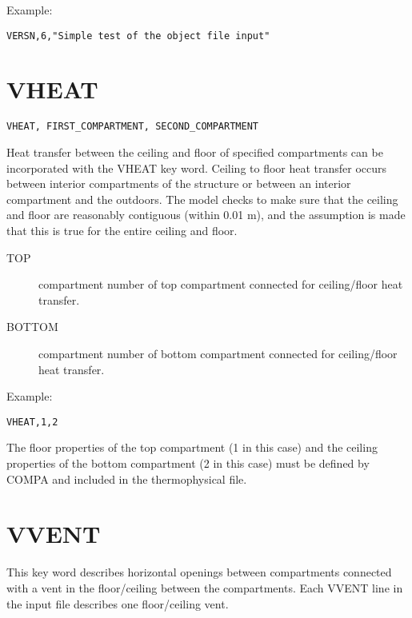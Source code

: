 \noindent Example:

\begin{lstlisting}
VERSN,6,"Simple test of the object file input"
\end{lstlisting}

\section{VHEAT}

\begin{lstlisting}
VHEAT, FIRST_COMPARTMENT, SECOND_COMPARTMENT
\end{lstlisting}

Heat transfer between the ceiling and floor of specified compartments can be incorporated with the VHEAT key word. Ceiling to floor heat transfer occurs between interior compartments of the structure or between an interior compartment and the outdoors. The model checks to make sure that the ceiling and floor are reasonably contiguous (within 0.01 m), and the assumption is made that this is true for the entire ceiling and floor.

\begin{adjustwidth}{1cm}{0cm}
\begin{description}
  \item[TOP] compartment number of top compartment connected for ceiling/floor heat transfer.
  \item[BOTTOM] compartment number of bottom compartment connected for ceiling/floor heat transfer.
\end{description}
\end{adjustwidth}

\noindent Example:

\begin{lstlisting}
VHEAT,1,2
\end{lstlisting}

The floor properties of the top compartment (1 in this case) and the ceiling properties of the bottom compartment (2 in this case) must be defined by COMPA and included in the thermophysical file.

\section{VVENT}

This key word describes horizontal openings between compartments connected with a vent in the floor/ceiling between the compartments. Each VVENT line in the input file describes one floor/ceiling vent.


